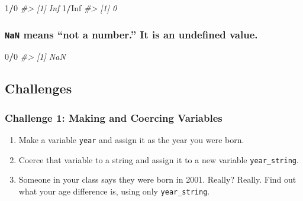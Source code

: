 \documentclass[
]{book}
\newenvironment{Shaded}{\begin{snugshade}}{\end{snugshade}}
\newcommand{\CommentTok}[1]{\textcolor[rgb]{0.56,0.35,0.01}{\textit{#1}}}
\newcommand{\DecValTok}[1]{\textcolor[rgb]{0.00,0.00,0.81}{#1}}
\newcommand{\OperatorTok}[1]{\textcolor[rgb]{0.81,0.36,0.00}{\textbf{#1}}}
\newcommand{\OtherTok}[1]{\textcolor[rgb]{0.56,0.35,0.01}{#1}}
\providecommand{\tightlist}{%
  \setlength{\itemsep}{0pt}\setlength{\parskip}{0pt}}
\begin{document}
\begin{Shaded}
\begin{Highlighting}[]
\DecValTok{1}\OperatorTok{/}\DecValTok{0}
\CommentTok{#> [1] Inf}
\DecValTok{1}\OperatorTok{/}\OtherTok{Inf}
\CommentTok{#> [1] 0}
\end{Highlighting}
\end{Shaded}

\hypertarget{nan-means-not-a-number.-it-is-an-undefined-value.}{%
\subsubsection*{\texorpdfstring{\texttt{NaN} means ``not a number.'' It is an undefined value.}{NaN means ``not a number.'' It is an undefined value.}}\label{nan-means-not-a-number.-it-is-an-undefined-value.}}

\begin{Shaded}
\begin{Highlighting}[]
\DecValTok{0}\OperatorTok{/}\DecValTok{0}
\CommentTok{#> [1] NaN}
\end{Highlighting}
\end{Shaded}

\hypertarget{challenges-3}{%
\subsection{Challenges}\label{challenges-3}}

\hypertarget{challenge-1-making-and-coercing-variables}{%
\subsubsection*{Challenge 1: Making and Coercing Variables}\label{challenge-1-making-and-coercing-variables}}

\begin{enumerate}
\def\labelenumi{\arabic{enumi}.}
\tightlist
\item
  Make a variable \texttt{year} and assign it as the year you were born.
\item
  Coerce that variable to a string and assign it to a new variable \texttt{year\_string}.
\item
  Someone in your class says they were born in 2001. Really? Really. Find out what your age difference is, using only \texttt{year\_string}.
\end{enumerate}
\end{document}
